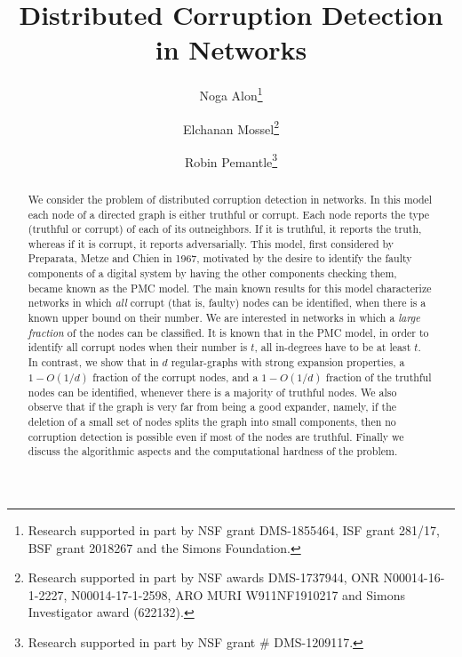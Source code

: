 \documentclass{toc}
\begin{document}
\begin{frontmatter} 
  
\title{Distributed Corruption Detection in Networks}  

\author[alon]{Noga Alon\thanks{Research supported in part by 
NSF grant DMS-1855464, ISF grant 281/17,
BSF grant 2018267
and the Simons Foundation.}}

\author[mossel]{Elchanan Mossel\thanks{Research supported in part by
NSF awards DMS-1737944, ONR N00014-16-1-2227, N00014-17-1-2598, ARO MURI W911NF1910217 and Simons Investigator award (622132).}} 

\author[pemantle]{Robin Pemantle\thanks{Research supported in part by 
NSF grant \# DMS-1209117.}}

\begin{abstract}
We consider the problem of
distributed  %
corruption detection in networks. In this model
each node of a directed graph is either truthful or corrupt. 
%
Each node reports  %
%
%
the type (truthful or corrupt) of each of its outneighbors.
%
If it is truthful,
it reports the truth, whereas if it is corrupt, %
it reports adversarially.
This model, first considered by Preparata, Metze and Chien in 1967,
motivated by the desire to identify
the faulty components of a digital system by having the other components
checking them, became known as the PMC model. The
main known results for this model
characterize networks in which \emph{all} corrupt (that is, faulty)
nodes can be identified,  %
when there is a known upper bound on their number.
%
%
We are interested in
%
networks in which    %
%
%
a \emph{large fraction} of the nodes can be classified. %
It is known that in the PMC model, 
in order to identify all corrupt  %
nodes when their number is $t$, %
all in-degrees have to be at least $t$. In contrast, we show
that in $d$ regular-graphs with strong expansion
properties,  %
a $1-O(1/d)$ fraction of the corrupt nodes, %
and a $1-O(1/d)$ fraction of the truthful %
nodes can be
identified, whenever there is a majority of truthful nodes.  %
We also observe that if the graph is very far from being a good expander,
namely, if the deletion of a small set of nodes splits the graph
into small components, then no corruption
detection is possible even if most of the nodes are truthful.  %
Finally we discuss the algorithmic aspects and the computational
hardness of the problem.
\end{abstract}

%

\end{frontmatter}
\end{document}
